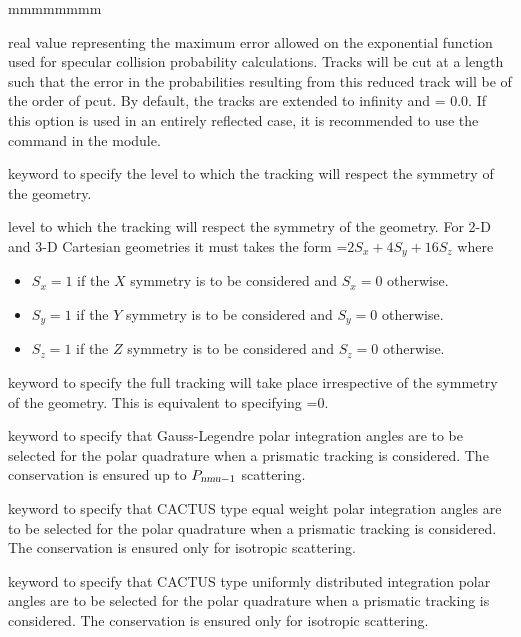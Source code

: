 \begin{ListeDeDescription}{mmmmmmmm}
\item[\dusa{pcut}] real value representing the maximum error allowed on the exponential function used
for specular collision probability calculations. Tracks will be cut at a length such that the error in the 
probabilities resulting from this reduced track will be of the order of pcut. By default, the tracks 
are extended to infinity and  = 0.0. If this option is used in an entirely reflected case, it is 
recommended to use the  command in the  module. 

\item[\moc{SYMM}] keyword to specify the level to which the tracking will respect the symmetry of the geometry. 

\item[\dusa{isymm}]  level to which the tracking will respect the symmetry of the geometry. For 2-D and 3-D Cartesian geometries it must takes the form =$2 S_{x}+4S_{y}+16 S_{z}$ where
\begin{itemize}
\item $S_{x}=1$ if the $X$ symmetry is to be considered and $S_{x}=0$ otherwise.   
\item $S_{y}=1$ if the $Y$ symmetry is to be considered and $S_{y}=0$ otherwise.   
\item $S_{z}=1$ if the $Z$ symmetry is to be considered and $S_{z}=0$ otherwise.   
\end{itemize}

\item[\moc{NOSY}] keyword to specify the full tracking will take place irrespective of the symmetry of the geometry. This is equivalent to specifying =0.

\item[\moc{GAUS}] keyword to specify that Gauss-Legendre polar integration angles are to be selected for the polar quadrature when a prismatic tracking is considered. The conservation is ensured up to $P_{\dusa{nmu}-1}$ scattering.

\item[\moc{CACA}] keyword to specify that CACTUS type equal weight polar integration angles are to be
selected for the polar quadrature when a prismatic tracking is considered.\cite{CACTUS} The conservation is ensured only for isotropic scattering.

\item[\moc{CACB}] keyword to specify that CACTUS type uniformly distributed integration polar angles
are to be selected for the polar quadrature when a prismatic tracking is considered.\cite{CACTUS} The conservation is ensured only for isotropic scattering.


\end{ListeDeDescription}
